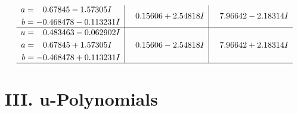 \documentclass[1p]{elsarticle_modified}
\theoremstyle{definition}
\begin{document}
$$\begin{array}{c|c|c}
\begin{aligned}
a &= \phantom{-}0.67845 - 1.57305 I \\
b &= -0.468478 - 0.113231 I\end{aligned}
 & \phantom{-}0.15606 + 2.54818 I & \phantom{-}7.96642 - 2.18314 I \\ \hline\begin{aligned}
u &= \phantom{-}0.483463 - 0.062902 I \\
a &= \phantom{-}0.67845 + 1.57305 I \\
b &= -0.468478 + 0.113231 I\end{aligned}
 & \phantom{-}0.15606 - 2.54818 I & \phantom{-}7.96642 + 2.18314 I\\
 \hline 
 \end{array}$$\newpage
\newpage\renewcommand{\arraystretch}{1}
\centering \section*{ III. u-Polynomials}
\end{document}
